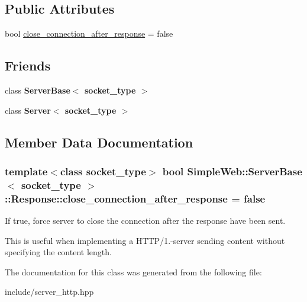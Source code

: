 \subsection*{Public Attributes}
\begin{DoxyCompactItemize}
\item 
bool \hyperlink{classSimpleWeb_1_1ServerBase_1_1Response_a2818b4f3c577ff1f4067bb1c62640c15}{close\+\_\+connection\+\_\+after\+\_\+response} = false
\end{DoxyCompactItemize}
\subsection*{Friends}
\begin{DoxyCompactItemize}
\item 
class {\bfseries Server\+Base$<$ socket\+\_\+type $>$}\hypertarget{classSimpleWeb_1_1ServerBase_1_1Response_a01d54a7e16ca437c98ec571deca98dfc}{}\label{classSimpleWeb_1_1ServerBase_1_1Response_a01d54a7e16ca437c98ec571deca98dfc}

\item 
class {\bfseries Server$<$ socket\+\_\+type $>$}\hypertarget{classSimpleWeb_1_1ServerBase_1_1Response_a3f155064c0074d68a408aa3193ca1666}{}\label{classSimpleWeb_1_1ServerBase_1_1Response_a3f155064c0074d68a408aa3193ca1666}

\end{DoxyCompactItemize}


\subsection{Member Data Documentation}
\subsubsection[{\texorpdfstring{close\+\_\+connection\+\_\+after\+\_\+response}{close_connection_after_response}}]{\setlength{\rightskip}{0pt plus 5cm}template$<$class socket\+\_\+type$>$ bool {\bf Simple\+Web\+::\+Server\+Base}$<$ socket\+\_\+type $>$\+::Response\+::close\+\_\+connection\+\_\+after\+\_\+response = false}\hypertarget{classSimpleWeb_1_1ServerBase_1_1Response_a2818b4f3c577ff1f4067bb1c62640c15}{}\label{classSimpleWeb_1_1ServerBase_1_1Response_a2818b4f3c577ff1f4067bb1c62640c15}
If true, force server to close the connection after the response have been sent.

This is useful when implementing a H\+T\+T\+P/1.-\/server sending content without specifying the content length. 

The documentation for this class was generated from the following file\+:\begin{DoxyCompactItemize}
\item 
include/server\+\_\+http.\+hpp\end{DoxyCompactItemize}
